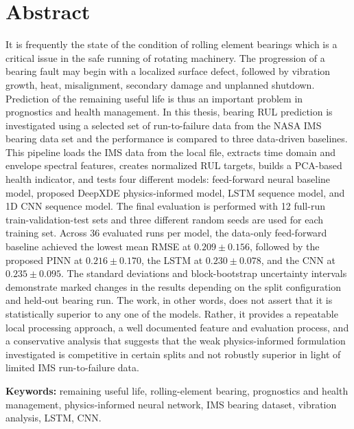 \chapter*{Abstract}

\noindent It is frequently the state of the condition of rolling element bearings which is a critical issue in the safe running of rotating machinery. The progression of a bearing fault may begin with a localized surface defect, followed by vibration growth, heat, misalignment, secondary damage and unplanned shutdown. Prediction of the remaining useful life is thus an important problem in prognostics and health management. In this thesis, bearing RUL prediction is investigated using a selected set of run-to-failure data from the NASA IMS bearing data set and the performance is compared to three data-driven baselines. This pipeline loads the IMS data from the local file, extracts time domain and envelope spectral features, creates normalized RUL targets, builds a PCA-based health indicator, and tests four different models: feed-forward neural baseline model, proposed DeepXDE physics-informed model, LSTM sequence model, and 1D CNN sequence model. The final evaluation is performed with 12 full-run train-validation-test sets and three different random seeds are used for each training set. Across 36 evaluated runs per model, the data-only feed-forward baseline achieved the lowest mean RMSE at \(0.209 \pm 0.156\), followed by the proposed PINN at \(0.216 \pm 0.170\), the LSTM at \(0.230 \pm 0.078\), and the CNN at \(0.235 \pm 0.095\). The standard deviations and block-bootstrap uncertainty intervals demonstrate marked changes in the results depending on the split configuration and held-out bearing run. The work, in other words, does not assert that it is statistically superior to any one of the models. Rather, it provides a repeatable local processing approach, a well documented feature and evaluation process, and a conservative analysis that suggests that the weak physics-informed formulation investigated is competitive in certain splits and not robustly superior in light of limited IMS run-to-failure data.

\textbf{Keywords:} remaining useful life, rolling-element bearing, prognostics and health management, physics-informed neural network, IMS bearing dataset, vibration analysis, LSTM, CNN.
